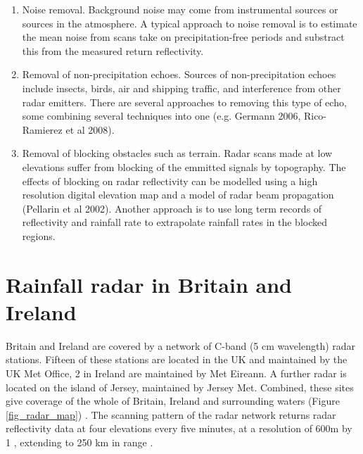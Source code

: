 \begin{enumerate}
\item Noise removal. Background noise may come from instrumental sources or sources in the atmosphere. A typical approach to noise removal is to estimate the mean noise from scans take on precipitation-free periods and substract this from the measured return reflectivity.

\item Removal of non-precipitation echoes. Sources of non-precipitation echoes include insects, birds, air and shipping traffic, and interference from other radar emitters. There are several approaches to removing this type of echo, some combining several techniques into one (e.g. Germann 2006, Rico-Ramierez et al 2008).

\item Removal of blocking obstacles such as terrain. Radar scans made at low elevations suffer from blocking of the emmitted signals by topography. The effects of blocking on radar reflectivity can be modelled using a high resolution digital elevation map and a model of radar beam propagation (Pellarin et al 2002). Another approach is to use long term records of reflectivity and rainfall rate to extrapolate rainfall rates in the blocked regions.

\end{enumerate}

\section{Rainfall radar in Britain and Ireland}

Britain and Ireland are covered by a network of C-band (5 cm wavelength) radar stations. Fifteen of these stations are located in the UK and maintained by the UK Met Office, 2 in Ireland are maintained by Met Eireann. A further radar is located on the island of Jersey, maintained by Jersey Met. Combined, these sites give coverage of the whole of Britain, Ireland and surrounding waters (Figure \ref{fig_radar_map}) . The scanning pattern of the radar network returns radar reflectivity data at four elevations every five minutes, at a resolution of 600m by 1 \degree, extending to 250 km in range \citep{harrison2012radar}. 



